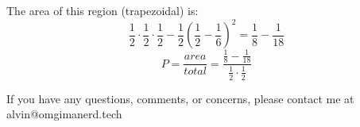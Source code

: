 \documentclass[letterpaper, 12pt]{math}
\begin{document}
The area of this region (trapezoidal) is:
\[ \frac{1}{2}\cdot\frac{1}{2}\cdot\frac{1}{2}-\frac{1}{2}(\frac{1}{2}-
   \frac{1}{6})^{2} = \frac{1}{8}-\frac{1}{18} \]
\[ P = \frac{area}{total} =
   \frac{\frac{1}{8}-\frac{1}{18}}{\frac{1}{2}\cdot\frac{1}{2}} \]

\begin{center}
  If you have any questions, comments, or concerns, please contact me at
  alvin@omgimanerd.tech
\end{center}
\end{document}
